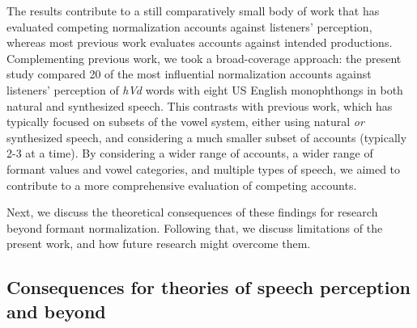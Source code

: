 \documentclass[preprint]{JASA}
\begin{document}
The results contribute to a still comparatively small body of work that has evaluated competing normalization accounts against listeners' perception, whereas most previous work evaluates accounts against intended productions. Complementing previous work, we took a broad-coverage approach: the present study compared 20 of the most influential normalization accounts against listeners' perception of \emph{hVd} words with eight US English monophthongs in both natural and synthesized speech. This contrasts with previous work, which has typically focused on subsets of the vowel system, either using natural \emph{or} synthesized speech, and considering a much smaller subset of accounts (typically 2-3 at a time). By considering a wider range of accounts, a wider range of formant values and vowel categories, and multiple types of speech, we aimed to contribute to a more comprehensive evaluation of competing accounts.

Next, we discuss the theoretical consequences of these findings for research beyond formant normalization. Following that, we discuss limitations of the present work, and how future research might overcome them.

\subsection{Consequences for theories of speech perception and beyond}\label{consequences-for-theories-of-speech-perception-and-beyond}
\end{document}
